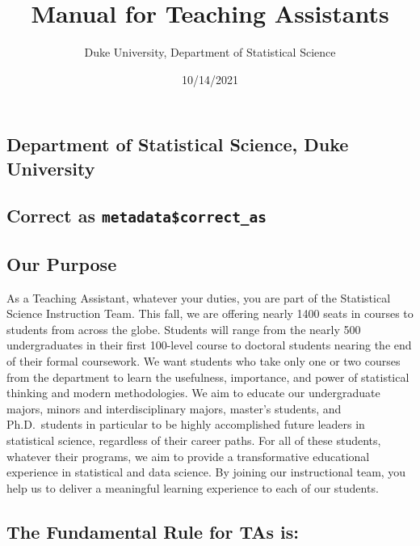 \documentclass[
]{article}
\title{Manual for Teaching Assistants}
\author{Duke University, Department of Statistical Science}
\date{10/14/2021}
\begin{document}
\maketitle

{
\setcounter{tocdepth}{2}
\tableofcontents
}
\hypertarget{department-of-statistical-science-duke-university}{%
\subsection*{Department of Statistical Science, Duke University}\label{department-of-statistical-science-duke-university}}

\hypertarget{correct-as-metadatacorrect_as}{%
\subsection*{\texorpdfstring{Correct as \texttt{metadata\$correct\_as}}{Correct as metadata\$correct\_as}}\label{correct-as-metadatacorrect_as}}

\hypertarget{our-purpose}{%
\subsection{Our Purpose}\label{our-purpose}}

As a Teaching Assistant, whatever your duties, you are part of the Statistical Science Instruction Team. This fall, we are offering nearly 1400 seats in courses to students from across the globe. Students will range from the nearly 500 undergraduates in their first 100-level course to doctoral students nearing the end of their formal coursework. We want students who take only one or two courses from the department to learn the usefulness, importance, and power of statistical thinking and modern methodologies. We aim to educate our undergraduate majors, minors and interdisciplinary majors, master's students, and Ph.D.~students in particular to be highly accomplished future leaders in statistical science, regardless of their career paths. For all of these students, whatever their programs, we aim to provide a transformative educational experience in statistical and data science. By joining our instructional team, you help us to deliver a meaningful learning experience to each of our students.

\hypertarget{the-fundamental-rule-for-tas-is}{%
\subsection{The Fundamental Rule for TAs is:}\label{the-fundamental-rule-for-tas-is}}
\end{document}
